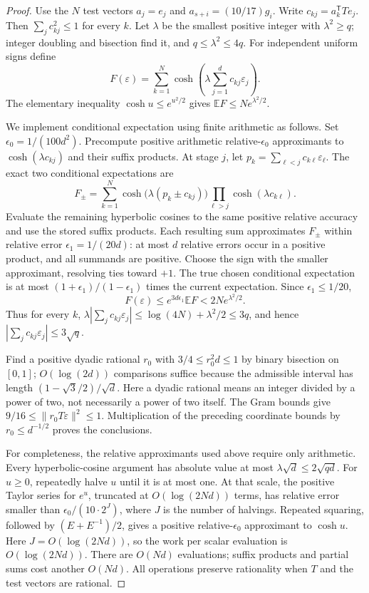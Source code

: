 \documentclass[11pt]{amsart}
\theoremstyle{definition}\newtheorem{definition}[theorem]{Definition}
\theoremstyle{remark}\newtheorem{remark}[theorem]{Remark}
\numberwithin{equation}{section}
\begin{document}
\begin{proof}
Use the $N$ test vectors $a_j=e_j$ and $a_{s+i}=(10/17)g_i$.
Write $c_{kj}=a_k^{\mathsf T}T e_j$.  Then
$\sum_jc_{kj}^2\le1$ for every $k$.
Let $\lambda$ be the smallest positive integer with $\lambda^2\ge q$;
integer doubling and bisection find it, and $q\le\lambda^2\le4q$.
For independent uniform signs define
\[
 F(\varepsilon)=\sum_{k=1}^N
                 \cosh\!\left(\lambda\sum_{j=1}^dc_{kj}\varepsilon_j\right).
\]
The elementary inequality $\cosh u\le e^{u^2/2}$ gives
$\mathbb EF\le N e^{\lambda^2/2}$.

We implement conditional expectation using finite arithmetic as follows.
Set $\epsilon_0=1/(100d^2)$.
Precompute positive arithmetic relative-$\epsilon_0$ approximants to
$\cosh(\lambda c_{kj})$ and their suffix products.
At stage $j$, let $p_k=\sum_{\ell<j}c_{k\ell}\varepsilon_\ell$.
The exact two conditional expectations are
\[
 F_\pm=\sum_{k=1}^N
       \cosh\bigl(\lambda(p_k\pm c_{kj})\bigr)
       \prod_{\ell>j}\cosh(\lambda c_{k\ell}).
\]
Evaluate the remaining hyperbolic cosines to the same positive relative accuracy and
use the stored suffix products.  Each resulting sum approximates $F_\pm$
within relative error $\epsilon_1=1/(20d)$: at most $d$ relative errors
occur in a positive product, and all summands are positive.
Choose the sign with the smaller approximant, resolving ties toward $+1$.
The true chosen conditional expectation is at most
$(1+\epsilon_1)/(1-\epsilon_1)$ times the current expectation.  Since
$\epsilon_1\le1/20$,
\[
 F(\varepsilon)
 \le e^{3d\epsilon_1}\mathbb EF
 <2N e^{\lambda^2/2}.
\]
Thus for every $k$,
$\lambda|\sum_jc_{kj}\varepsilon_j|
\le\log(4N)+\lambda^2/2\le3q$, and hence
$|\sum_jc_{kj}\varepsilon_j|\le3\sqrt q$.

Find a positive dyadic rational $r_0$ with
$3/4\le r_0^2d\le1$ by binary bisection on $[0,1]$;
$O(\log(2d))$ comparisons suffice because the admissible interval has
length $(1-\sqrt3/2)/\sqrt d$. Here a dyadic rational means an integer
divided by a power of two, not necessarily a power of two itself.
The Gram bounds give $9/16\le\|r_0T\varepsilon\|^2\le1$.
Multiplication of the preceding coordinate bounds by
$r_0\le d^{-1/2}$ proves the conclusions.

For completeness, the relative approximants used above require only
arithmetic.  Every hyperbolic-cosine argument has absolute value at most
$\lambda\sqrt d\le2\sqrt{qd}$.
For $u\ge0$, repeatedly halve $u$ until it is at most one.  At that
scale, the positive Taylor series for $e^u$, truncated at
$O(\log(2Nd))$ terms, has relative error smaller than
$\epsilon_0/(10\cdot2^J)$, where $J$ is the number of halvings.
Repeated squaring, followed by
$(E+E^{-1})/2$, gives a positive relative-$\epsilon_0$ approximant to
$\cosh u$.  Here $J=O(\log(2Nd))$, so the work per scalar evaluation
is $O(\log(2Nd))$.  There are $O(Nd)$ evaluations; suffix products and
partial sums cost another $O(Nd)$.
All operations preserve rationality when $T$ and the test vectors are rational.
\end{proof}
\end{document}
